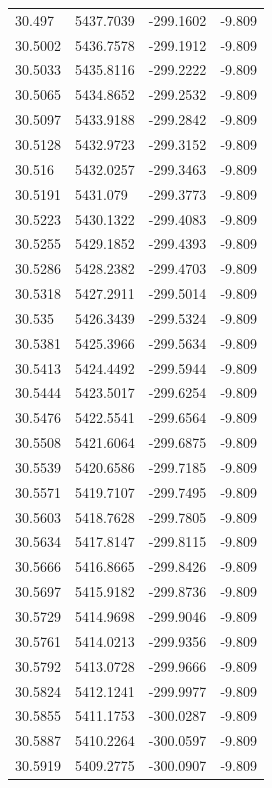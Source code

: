 \begin{table}[H]
\begin{tabular}{llll}
30.497 & 5437.7039 & -299.1602 & -9.809 \\
30.5002 & 5436.7578 & -299.1912 & -9.809 \\
30.5033 & 5435.8116 & -299.2222 & -9.809 \\
30.5065 & 5434.8652 & -299.2532 & -9.809 \\
30.5097 & 5433.9188 & -299.2842 & -9.809 \\
30.5128 & 5432.9723 & -299.3152 & -9.809 \\
30.516 & 5432.0257 & -299.3463 & -9.809 \\
30.5191 & 5431.079 & -299.3773 & -9.809 \\
30.5223 & 5430.1322 & -299.4083 & -9.809 \\
30.5255 & 5429.1852 & -299.4393 & -9.809 \\
30.5286 & 5428.2382 & -299.4703 & -9.809 \\
30.5318 & 5427.2911 & -299.5014 & -9.809 \\
30.535 & 5426.3439 & -299.5324 & -9.809 \\
30.5381 & 5425.3966 & -299.5634 & -9.809 \\
30.5413 & 5424.4492 & -299.5944 & -9.809 \\
30.5444 & 5423.5017 & -299.6254 & -9.809 \\
30.5476 & 5422.5541 & -299.6564 & -9.809 \\
30.5508 & 5421.6064 & -299.6875 & -9.809 \\
30.5539 & 5420.6586 & -299.7185 & -9.809 \\
30.5571 & 5419.7107 & -299.7495 & -9.809 \\
30.5603 & 5418.7628 & -299.7805 & -9.809 \\
30.5634 & 5417.8147 & -299.8115 & -9.809 \\
30.5666 & 5416.8665 & -299.8426 & -9.809 \\
30.5697 & 5415.9182 & -299.8736 & -9.809 \\
30.5729 & 5414.9698 & -299.9046 & -9.809 \\
30.5761 & 5414.0213 & -299.9356 & -9.809 \\
30.5792 & 5413.0728 & -299.9666 & -9.809 \\
30.5824 & 5412.1241 & -299.9977 & -9.809 \\
30.5855 & 5411.1753 & -300.0287 & -9.809 \\
30.5887 & 5410.2264 & -300.0597 & -9.809 \\
30.5919 & 5409.2775 & -300.0907 & -9.809 \\

\end{tabular}
\end{table}
